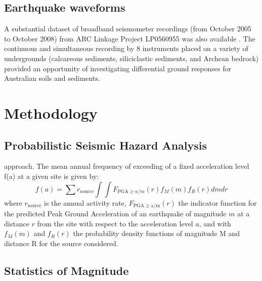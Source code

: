 \documentclass{report}
\begin{document}
\section{Earthquake waveforms}
A substantial dataset of broadband seismometer recordings (from
October 2005 to October 2008) from ARC Linkage Project LP0560955 was
also available \cite{revets-al09:intraplate}. The continuous and
simultaneous recording by 8 instruments placed on a variety of
undergrounds (calcareous sediments, siliciclastic sediments, and
Archean bedrock) provided an opportunity of investigating differential
ground responses for Australian soils and sediments.

\chapter{Methodology}
\section{Probabilistic Seismic Hazard Analysis}

 approach. The mean annual frequency of exceeding
of a fixed acceleration level f(a) at a given site is given by:
\begin{equation}
  \label{eq:cornell}
f(a) = \sum r_\mathrm{source} \int\int F_{\mathrm{PGA} \geq a/m}(r) f_M(m) f_R(r) dm dr
\end{equation}
where $r_\mathrm{source}$ is the annual activity rate, $F_{\mathrm{PGA
    \geq a/m}}(r)$ the indicator function for the predicted Peak Ground
Acceleration of an earthquake of magnitude $m$ at a distance $r$ from
the site with respect to the acceleration level $a$, and with $f_M(m)$
and $f_R(r)$ the probability density functions of magnitude M and
distance R for the source considered.

\section{Statistics of Magnitude}
\end{document}

